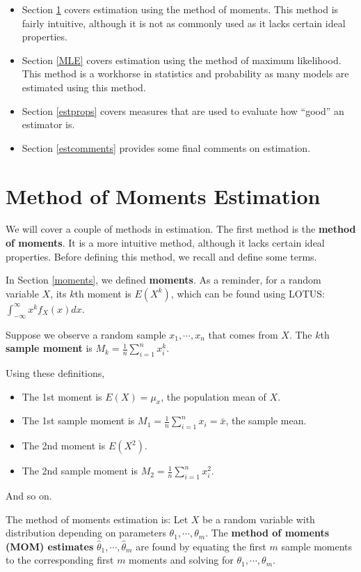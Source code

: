 \documentclass[
]{book}
\providecommand{\tightlist}{%
  \setlength{\itemsep}{0pt}\setlength{\parskip}{0pt}}
\begin{document}
\begin{itemize}
\tightlist
\item
  Section \ref{MOM} covers estimation using the method of moments. This method is fairly intuitive, although it is not as commonly used as it lacks certain ideal properties.
\item
  Section \ref{MLE} covers estimation using the method of maximum likelihood. This method is a workhorse in statistics and probability as many models are estimated using this method.
\item
  Section \ref{estprops} covers measures that are used to evaluate how ``good'' an estimator is.
\item
  Section \ref{estcomments} provides some final comments on estimation.
\end{itemize}

\hypertarget{MOM}{%
\section{Method of Moments Estimation}\label{MOM}}

We will cover a couple of methods in estimation. The first method is the \textbf{method of moments}. It is a more intuitive method, although it lacks certain ideal properties. Before defining this method, we recall and define some terms.

In Section \ref{moments}, we defined \textbf{moments}. As a reminder, for a random variable \(X\), its \(k\)th moment is \(E(X^k)\), which can be found using LOTUS: \(\int_{-\infty}^{\infty} x^k f_X(x) dx\).

Suppose we observe a random sample \(x_1, \cdots, x_n\) that comes from \(X\). The \(k\)th \textbf{sample moment} is \(M_k = \frac{1}{n} \sum_{i=1}^n x_i^k\).

Using these definitions,

\begin{itemize}
\tightlist
\item
  The 1st moment is \(E(X) = \mu_x\), the population mean of \(X\).
\item
  The 1st sample moment is \(M_1 = \frac{1}{n} \sum_{i=1}^n x_i = \bar{x}\), the sample mean.
\item
  The 2nd moment is \(E(X^2)\).
\item
  The 2nd sample moment is \(M_2 = \frac{1}{n} \sum_{i=1}^n x_i^2\).
\end{itemize}

And so on.

The method of moments estimation is: Let \(X\) be a random variable with distribution depending on parameters \(\theta_1, \cdots, \theta_m\). The \textbf{method of moments (MOM) estimates} \(\hat{\theta}_1, \cdots, \hat{\theta}_m\) are found by equating the first \(m\) sample moments to the corresponding first \(m\) moments and solving for \(\theta_1, \cdots, \theta_m\).
\end{document}
